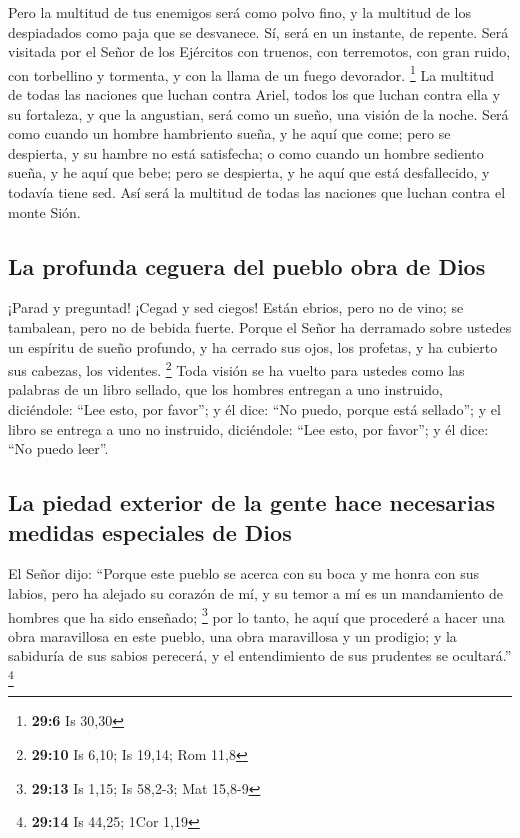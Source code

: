 \begin{paracol}{2}
 Pero la multitud de tus enemigos será como polvo fino, y
la multitud de los despiadados como paja que se desvanece. Sí, será en
un instante, de repente.  Será visitada por el Señor de
los Ejércitos con truenos, con terremotos, con gran ruido, con
torbellino y tormenta, y con la llama de un fuego devorador. \footnote{\textbf{29:6}
  Is 30,30}  La multitud de todas las naciones que luchan
contra Ariel, todos los que luchan contra ella y su fortaleza, y que la
angustian, será como un sueño, una visión de la noche. 
Será como cuando un hombre hambriento sueña, y he aquí que come; pero se
despierta, y su hambre no está satisfecha; o como cuando un hombre
sediento sueña, y he aquí que bebe; pero se despierta, y he aquí que
está desfallecido, y todavía tiene sed. Así será la multitud de todas
las naciones que luchan contra el monte Sión.

\hypertarget{la-profunda-ceguera-del-pueblo-obra-de-dios}{%
\subsection{La profunda ceguera del pueblo obra de
Dios}\label{la-profunda-ceguera-del-pueblo-obra-de-dios}}

 ¡Parad y preguntad! ¡Cegad y sed ciegos! Están ebrios,
pero no de vino; se tambalean, pero no de bebida fuerte. 
Porque el Señor ha derramado sobre ustedes un espíritu de sueño
profundo, y ha cerrado sus ojos, los profetas, y ha cubierto sus
cabezas, los videntes. \footnote{\textbf{29:10} Is 6,10; Is 19,14; Rom
  11,8}  Toda visión se ha vuelto para ustedes como las
palabras de un libro sellado, que los hombres entregan a uno instruido,
diciéndole: ``Lee esto, por favor''; y él dice: ``No puedo, porque está
sellado'';  y el libro se entrega a uno no instruido,
diciéndole: ``Lee esto, por favor''; y él dice: ``No puedo leer''.

\hypertarget{la-piedad-exterior-de-la-gente-hace-necesarias-medidas-especiales-de-dios}{%
\subsection{La piedad exterior de la gente hace necesarias medidas
especiales de
Dios}\label{la-piedad-exterior-de-la-gente-hace-necesarias-medidas-especiales-de-dios}}

 El Señor dijo: ``Porque este pueblo se acerca con su
boca y me honra con sus labios, pero ha alejado su corazón de mí, y su
temor a mí es un mandamiento de hombres que ha sido enseñado;
\footnote{\textbf{29:13} Is 1,15; Is 58,2-3; Mat 15,8-9} 
por lo tanto, he aquí que procederé a hacer una obra maravillosa en este
pueblo, una obra maravillosa y un prodigio; y la sabiduría de sus sabios
perecerá, y el entendimiento de sus prudentes se ocultará.'' \footnote{\textbf{29:14}
  Is 44,25; 1Cor 1,19}


\end{paracol}
